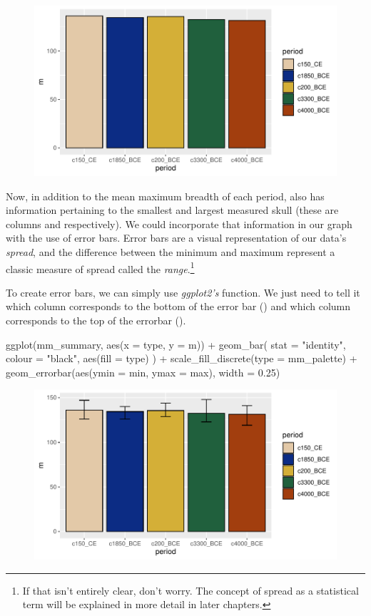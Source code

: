 \begin{figure}[H]
\includegraphics[scale = .75]{graphics/ch3Figs/bar_2.pdf}
\end{figure}

Now, in addition to the mean maximum breadth of each period,  also has information pertaining to the smallest and largest measured skull (these are columns  and  respectively). We could incorporate that information in our graph with the use of \glspl{error bar}. Error bars are a visual representation of our data's \textit{spread}, and the difference between the minimum and maximum represent a classic measure of spread called the \textit{range}.\footnote{If that isn't entirely clear, don't worry. The concept of spread as a statistical term will be explained in more detail in later chapters.}

To create error bars, we can simply use \textit{ggplot2's}  function. We just need to tell it which column corresponds to the bottom of the error bar () and which column corresponds to the top of the errorbar ().

\begin{inR}
ggplot(mm_summary, aes(x = type, y = m)) +
  geom_bar(
    stat = "identity",
    colour = "black",
    aes(fill = type)
  ) +
  scale_fill_discrete(type = mm_palette) +
  geom_errorbar(aes(ymin = min, ymax = max), width = 0.25)
\end{inR}

\vspace{2em}

\begin{figure}[H]
\includegraphics[scale = .75]{graphics/ch3Figs/bar_3.pdf}
\end{figure}

